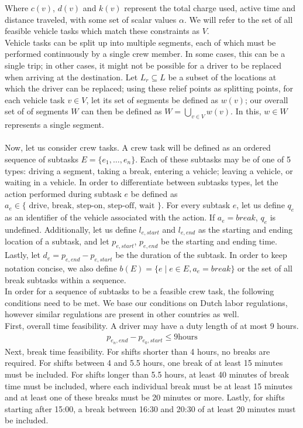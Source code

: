 \documentclass[]{article}
\begin{document}
Where $c(v)$, $d(v)$ and $k(v)$ represent the total charge used, active time and distance traveled, with some set of scalar values $\alpha$. We will refer to the set of all feasible vehicle tasks which match these constraints as $V$. \\
Vehicle tasks can be split up into multiple segments, each of which must be performed continuously by a single crew member. In some cases, this can be a single trip; in other cases, it might not be possible for a driver to be replaced when arriving at the destination. Let $L_r \subseteq L$ be a subset of the locations at which the driver can be replaced; using these relief points as splitting points, for each vehicle task $v \in V$, let its set of segments be defined as $w(v)$; our overall set of of segments $W$ can then be defined as $W = \bigcup_{v \in V}w(v)$. In this, $w \in W$ represents a single segment. \\\\
Now, let us consider crew tasks. A crew task will be defined as an ordered sequence of subtasks $E = \{ e_1, \dots, e_n \}$. Each of these subtasks may be of one of 5 types: driving a segment, taking a break, entering a vehicle; leaving a vehicle, or waiting in a vehicle. In order to differentiate between subtasks types, let the action performed during subtask $e$ be defined as $a_e \in \{\text{ drive, break, step-on, step-off, wait }\}$. For every subtask $e$, let us define $q_e$ as an identifier of the vehicle associated with the action. If $a_e = break$, $q_e$ is undefined. Additionally, let us define $l_{e,start}$ and $l_{e,end}$ as the starting and ending location of a subtask, and let $p_{e,start}$, $p_{e,end}$ be the starting and ending time. Lastly, let $d_e = p_{e,end} - p_{e,start}$ be the duration of the subtask. In order to keep notation concise, we also define $b(E) = \{ e \mid e \in E, a_e = break \}$ or the set of all break subtasks within a sequence.\\
In order for a sequence of subtasks to be a feasible crew task, the following conditions need to be met. We base our conditions on Dutch labor regulations, however similar regulations are present in other countries as well. \\ 
First, overall time feasibility. A driver may have a duty length of at most 9 hours. \\
\begin{align}
  p_{e_n,end} - p_{e_0,start} \leq 9\text{hours}
\end{align}
Next, break time feasibility. For shifts shorter than 4 hours, no breaks are required. For shifts between 4 and 5.5 hours, one break of at least 15 minutes must be included. For shifts longer than 5.5 hours, at least 40 minutes of break time must be included, where each individual break must be at least 15 minutes and at least one of these breaks must be 20 minutes or more. Lastly, for shifts starting after 15:00, a break between 16:30 and 20:30 of at least 20 minutes must be included. 
\end{document}
